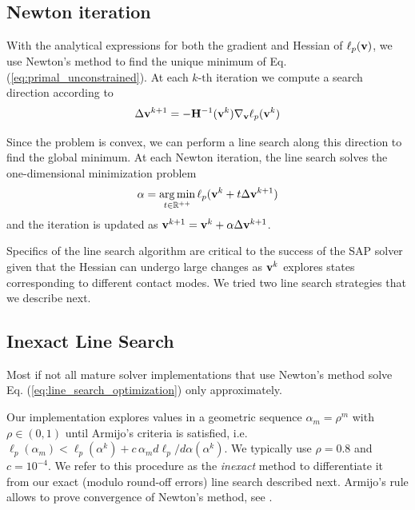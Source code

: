 
\subsection{Newton iteration}
\label{sec:solver_details}

With the analytical expressions for both the gradient and Hessian of
$\ell_p({\mathbf{v}})$, we use Newton's method to find the unique minimum of Eq.
(\ref{eq:primal_unconstrained}). At each $k\text{-th}$ iteration we
compute a search direction according to
\begin{equation}
	\Delta\mf{v}^{k+1} = -\mf{H}^{-1}(\mf{v}^k)\nabla_\mf{v}\ell_p(\mf{v}^k)
	\label{eq:Newton_iteration}
\end{equation}

Since the problem is convex, we can perform a line search along this direction
to find the global minimum. At each Newton iteration, the line search solves the
one-dimensional minimization problem
\begin{eqnarray}
	\alpha = \argmin_{t\in\mathbb{R}^{++}} \ell_p(\mf{v}^k + t \Delta\mf{v}^{k+1})
	\label{eq:line_search_optimization}
\end{eqnarray}
and the iteration is updated as ${\mathbf{v}}^{k+1}={\mathbf{v}}^{k} + \alpha
\Delta{\mathbf{v}}^{k+1}$.

Specifics of the line search algorithm are critical to the success of the SAP
solver given that the Hessian can undergo large changes as ${\mathbf{v}}^k$ explores
states corresponding to different contact modes. We tried two line search
strategies that we describe next.

\subsection{Inexact Line Search}
Most if not all mature solver implementations that use Newton's method solve Eq.
(\ref{eq:line_search_optimization}) only approximately.

Our implementation explores values in a geometric sequence $\alpha_{m} = \rho^m$
with $\rho \in (0, 1)$ until Armijo's criteria is satisfied, i.e.
$\ell_p(\alpha_m) < \ell_p(\alpha^k) + c\,\alpha_m d\ell_p/d\alpha(\alpha^k)$.
We typically use $\rho=0.8$ and $c=10^{-4}$. We refer to this procedure as the
\textit{inexact} method to differentiate it from our exact (modulo round-off
errors) line search described next. Armijo's rule allows to prove convergence of
Newton's method, see .


